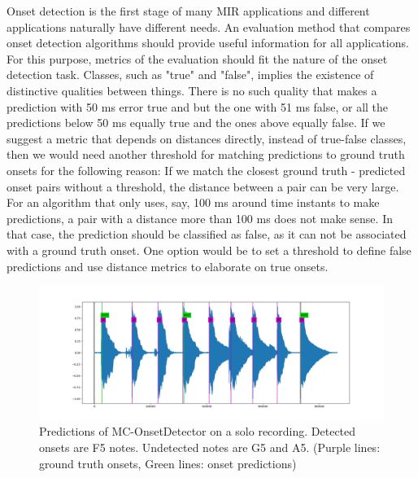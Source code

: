 Onset detection is the first stage of many MIR applications and different applications naturally have different needs. An evaluation method that compares onset detection algorithms should provide useful information for all applications. For this purpose, metrics of the evaluation should fit the nature of the onset detection task. Classes, such as "true" and "false", implies the existence of distinctive qualities between things. There is no such quality that makes a prediction with 50 ms error true and but the one with 51 ms false, or all the predictions below 50 ms equally true and the ones above equally false. If we suggest a metric that depends on distances directly, instead of true-false classes, then we would need another threshold for matching predictions to ground truth onsets for the following reason: If we match the closest ground truth - predicted onset pairs without a threshold, the distance between a pair can be very large. For an algorithm that only uses, say, 100 ms around time instants to make predictions, a pair with a distance more than 100 ms does not make sense. In that case, the prediction should be classified as false, as it can not be associated with a ground truth onset. One option would be to set a threshold to define false predictions and use distance metrics to elaborate on true onsets. 


\begin{figure}
    \centering
    \includegraphics[width=\columnwidth]{discussion/MC217.png}
    \caption{Predictions of MC-OnsetDetector on a solo recording. Detected onsets are F5 notes. Undetected notes are G5 and A5. (Purple lines: ground truth onsets, Green lines: onset predictions)}
    \label{fig:mc217}
\end{figure}

